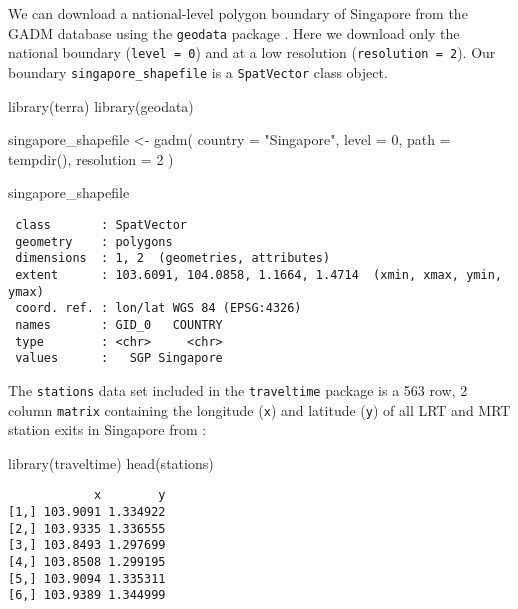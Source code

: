 \documentclass[
  12pt]{article}
\newenvironment{Shaded}{\begin{snugshade}}{\end{snugshade}}
\newcommand{\AttributeTok}[1]{\textcolor[rgb]{0.40,0.45,0.13}{#1}}
\newcommand{\DecValTok}[1]{\textcolor[rgb]{0.68,0.00,0.00}{#1}}
\newcommand{\FunctionTok}[1]{\textcolor[rgb]{0.28,0.35,0.67}{#1}}
\newcommand{\NormalTok}[1]{\textcolor[rgb]{0.00,0.23,0.31}{#1}}
\newcommand{\OtherTok}[1]{\textcolor[rgb]{0.00,0.23,0.31}{#1}}
\newcommand{\StringTok}[1]{\textcolor[rgb]{0.13,0.47,0.30}{#1}}
\begin{document}
We can download a national-level polygon boundary of Singapore from the
GADM \citep{gadm} database using the \texttt{geodata} package
\citep{geodata}. Here we download only the national boundary
(\texttt{level\ =\ 0}) and at a low resolution
(\texttt{resolution\ =\ 2}). Our boundary \texttt{singapore\_shapefile}
is a \texttt{SpatVector} class object.

\begin{Shaded}
\begin{Highlighting}[]
\FunctionTok{library}\NormalTok{(terra)}
\FunctionTok{library}\NormalTok{(geodata)}

\NormalTok{singapore\_shapefile }\OtherTok{\textless{}{-}} \FunctionTok{gadm}\NormalTok{(}
  \AttributeTok{country =} \StringTok{"Singapore"}\NormalTok{,}
  \AttributeTok{level =} \DecValTok{0}\NormalTok{,}
  \AttributeTok{path =} \FunctionTok{tempdir}\NormalTok{(),}
  \AttributeTok{resolution =} \DecValTok{2}
\NormalTok{)}

\NormalTok{singapore\_shapefile}
\end{Highlighting}
\end{Shaded}

\begin{verbatim}
 class       : SpatVector 
 geometry    : polygons 
 dimensions  : 1, 2  (geometries, attributes)
 extent      : 103.6091, 104.0858, 1.1664, 1.4714  (xmin, xmax, ymin, ymax)
 coord. ref. : lon/lat WGS 84 (EPSG:4326) 
 names       : GID_0   COUNTRY
 type        : <chr>     <chr>
 values      :   SGP Singapore
\end{verbatim}

The \texttt{stations} data set included in the \texttt{traveltime}
package is a 563 row, 2 column \texttt{matrix} containing the longitude
(\texttt{x}) and latitude (\texttt{y}) of all LRT and MRT station exits
in Singapore from \citet{singdata}:

\begin{Shaded}
\begin{Highlighting}[]
\FunctionTok{library}\NormalTok{(traveltime)}
\FunctionTok{head}\NormalTok{(stations)}
\end{Highlighting}
\end{Shaded}

\begin{verbatim}
            x        y
[1,] 103.9091 1.334922
[2,] 103.9335 1.336555
[3,] 103.8493 1.297699
[4,] 103.8508 1.299195
[5,] 103.9094 1.335311
[6,] 103.9389 1.344999
\end{verbatim}
\end{document}
